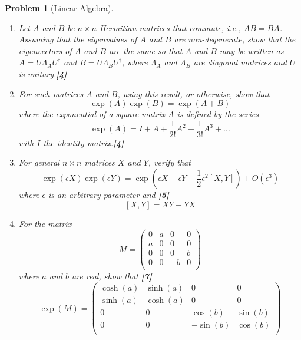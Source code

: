 \documentclass[a4paper]{article}
\theoremstyle{new}
\newtheorem{qns}{Problem}[section]
\begin{document}
\begin{qns}[Linear Algebra]\leavevmode
\begin{enumerate}[label=(\alph*)]
\item Let $A$ and $B$ be $n\times n$ Hermitian matrices that commute, i.e., $AB = BA$. Assuming that the eigenvalues of $A$ and $B$ are non-degenerate, show that the eigenvectors of $A$ and $B$ are the same so that $A$ and $B$ may be written as $A = U\Lambda_AU^\dag$ and $B = U\Lambda_BU^\dag$, where $\Lambda_A$ and $\Lambda_B$ are diagonal matrices and $U$ is unitary.\hfill \textbf{[4]}
\item For such matrices $A$ and $B$, using this result, or otherwise, show that
$$\exp(A) \exp(B) = \exp(A + B)$$
where the exponential of a square matrix $A$ is defined by the series
$$\exp(A)=I+A+\frac{1}{2!}A^2+\frac{1}{3!}A^3+...$$
with $I$ the identity matrix.\hfill \textbf{[4]}
\item For general $n\times n$ matrices $X$ and $Y$, verify that
$$\exp(\epsilon X)\exp(\epsilon Y)=\exp(\epsilon X+\epsilon Y+\frac{1}{2}\epsilon^2[X,Y])+O(\epsilon^3)$$
where $\epsilon$ is an arbitrary parameter and \hfill \textbf{[5]}
$$[X,Y]= XY − YX$$
\item For the matrix
$$M=\begin{pmatrix}0&a&0&0\\a&0&0&0\\0&0&0&b\\0&0&-b&0\\\end{pmatrix}$$
where $a$ and $b$ are real, show that \hfill \textbf{[7]}
$$\exp(M)=\begin{pmatrix}\cosh(a)&\sinh(a)&0&0\\\sinh(a)&\cosh(a)&0&0\\0&0&\cos(b)&\sin(b)\\0&0&-\sin(b)&\cos(b)\\\end{pmatrix}$$
\end{enumerate}
\end{qns}
\end{document}
